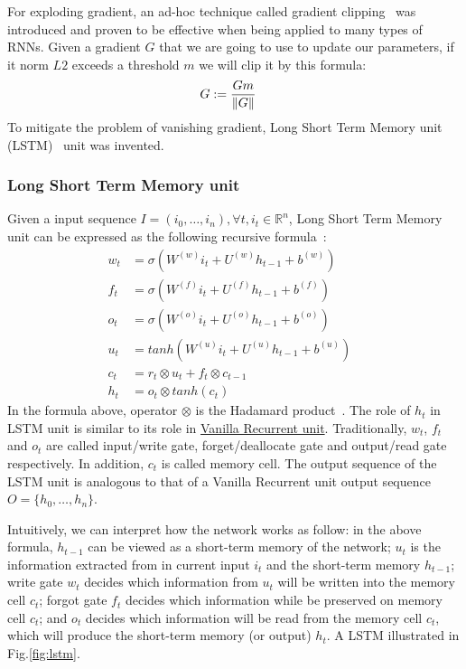 For exploding gradient, an ad-hoc technique called gradient clipping~\cite{hardRNN} was introduced and proven to be effective when being applied to many types of RNNs.
Given a gradient \(G\) that we are going to use to update our parameters, if it norm \(L2\) exceeds a threshold \(m\) we will clip it by this formula:
\begin{align}
      G &:= \frac{Gm}{\left\lVert G \right\rVert} &
\end{align}
To mitigate the problem of vanishing gradient, Long Short Term Memory unit (LSTM)~\cite{originLSTM} unit was invented.


\subsubsection{Long Short Term Memory unit}\label{sec:lstm}
Given a input sequence \(I = (i_0,\ldots,i_n), \forall t, i_t \in \mathbb{R}^n\), Long Short Term Memory unit can be expressed as the following recursive formula~\cite{treeLSTM}:
\begin{align}
    w_t &= \sigma(W^{(w)}i_t + U^{(w)}h_{t-1} + b^{(w)}) \label{eq:lstm-input-gate}&\\
      f_t &= \sigma(W^{(f)}i_t + U^{(f)}h_{t-1} + b^{(f)}) \label{eq:lstm-forget-gate}&\\
      o_t &= \sigma(W^{(o)}i_t + U^{(o)}h_{t-1} + b^{(o)}) \label{eq:lstm-output-gate}&\\
      u_t &= tanh(W^{(u)}i_t + U^{(u)}h_{t-1} + b^{(u)}) \label{eq:lstm-update-gate}&\\
      c_t &= r_t \otimes u_t + f_t \otimes c_{t-1} \label{eq:longterm-mem}&\\
      h_t &= o_t \otimes tanh(c_t) \label{eq:temperal-mem}&
\end{align}
In the formula above, operator \(\otimes\) is the Hadamard product~\cite{element-prod}.
The role of \(h_t\) in LSTM unit is similar to its role in \hyperref[sec:vanilla-rnn]{Vanilla Recurrent unit}.
Traditionally, \(w_t\), \(f_t\) and \(o_t\) are called input/write gate, forget/deallocate gate and output/read gate respectively.
In addition, \(c_t\) is called memory cell.
The output sequence of the LSTM unit is analogous to that of a Vanilla Recurrent unit output sequence \(O = \{h_0,\ldots,h_n\}\).

Intuitively, we can interpret how the network works as follow: in the above formula, \(h_{t-1}\) can be viewed as a short-term memory of the network; \(u_t\) is the information extracted from in current input \(i_t\) and the short-term memory \(h_{t-1}\); write gate \(w_t\) decides which information from \(u_t\) will be written into the memory cell \(c_t\); forgot gate \(f_t\) decides which information while be preserved on memory cell \(c_t\); and \(o_t\) decides which information will be read from the memory cell \(c_t\), which will produce the short-term memory (or output) \(h_t\).
A LSTM illustrated in Fig.\ref{fig:lstm}.

